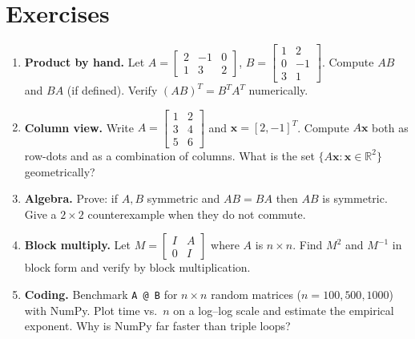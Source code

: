 \section{Exercises}
\label{sec:ch02-exercises}
\begin{enumerate}[label=E2.\arabic*, leftmargin=*, itemsep=0.8em]
\item \textbf{Product by hand.} Let $A=\begin{bmatrix}2&-1&0\\1&3&2\end{bmatrix}$, $B=\begin{bmatrix}1&2\\0&-1\\3&1\end{bmatrix}$. Compute $AB$ and $BA$ (if defined). Verify $(AB)^T=B^TA^T$ numerically.
\item \textbf{Column view.} Write $A=\begin{bmatrix}1&2\\3&4\\5&6\end{bmatrix}$ and $\mathbf{x}=[2,-1]^T$. Compute $A\mathbf{x}$ both as row-dots and as a combination of columns. What is the set $\{A\mathbf{x}:\mathbf{x}\in\mathbb{R}^2\}$ geometrically?
\item \textbf{Algebra.} Prove: if $A,B$ symmetric and $AB=BA$ then $AB$ is symmetric. Give a $2\times2$ counterexample when they do not commute.
\item \textbf{Block multiply.} Let $M=\begin{bmatrix}I&A\\0&I\end{bmatrix}$ where $A$ is $n\times n$. Find $M^2$ and $M^{-1}$ in block form and verify by block multiplication.
\item \textbf{Coding.} Benchmark \texttt{A @ B} for $n\times n$ random matrices ($n=100,500,1000$) with NumPy. Plot time vs.\ $n$ on a log--log scale and estimate the empirical exponent. Why is NumPy far faster than triple loops?
\end{enumerate}
